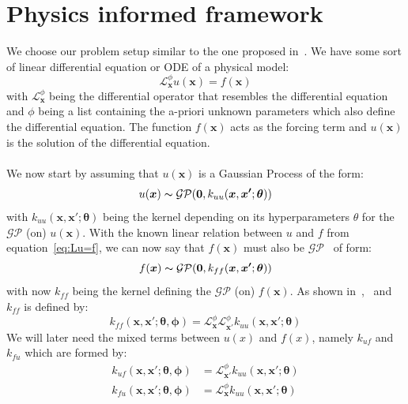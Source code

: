 \documentclass{article}
\begin{document}
\section{Physics informed framework}
We choose our problem setup similar to the one proposed in~\cite{RAISSI}. We have some sort of linear differential equation or ODE of a physical model:
\begin{equation}
    \label{eq:Lu=f}
    \mathcal{L}_{\bm{x}}^\phi u(\bm{x}) = f(\bm{x})
\end{equation}
with $\mathcal{L}_{\bm{x}}^\phi$ being the differential operator that resembles the differential equation and $\phi$ being a list containing the a-priori unknown parameters which also define the differential equation. The function $f(\bm{x})$ acts as the forcing term and $u(\bm{x})$ is the solution of the differential equation.  \\
\\
We now start by assuming that $u(\bm{x})$ is a Gaussian Process of the form:
\begin{equation}
    u(\bm{x}) \thicksim \mathcal{G}\mathcal{P}(\bm{0},k_{uu}(\bm{x},\bm{x'};\bm{\theta}))
\end{equation}
with $k_{uu}(\bm{x},\bm{x'};\bm{\theta})$ being the kernel depending on its hyperparameters $\theta$ for the $\mathcal{G}\mathcal{P}$ (on) $u(\bm{x})$. With the known linear relation between $u$ and $f$ from equation~\ref{eq:Lu=f}, we can now say that $f(\bm{x})$ must also be $\mathcal{G}\mathcal{P}$~\cite{RasmussenCarlEdward} of form:
\begin{equation}
    f(\bm{x}) \thicksim \mathcal{G}\mathcal{P}(\bm{0},k_{ff}(\bm{x},\bm{x'};\bm{\theta}))
\end{equation}
with now $k_{ff}$ being the kernel defining the $\mathcal{G}\mathcal{P}$ (on) $f(\bm{x})$. As shown in~\cite{garnett_2023_full},~\cite{Särkkä} and~\cite{RAISSI} $k_{ff}$ is defined by:
\begin{equation}
    k_{ff}(\bm{x},\bm{x'};\bm{\theta}, \bm{\phi}) = \mathcal{L}_{\bm{x}}^\phi \mathcal{L}_{\bm{x'}}^\phi k_{uu}(\bm{x},\bm{x'};\bm{\theta}) 
\end{equation}
We will later need the mixed terms between $u(x)$ and $f(x)$, namely $k_{uf}$ and $k_{fu}$ which are formed by:
\begin{equation}
    \begin{aligned}
        k_{uf}(\bm{x,x'};\bm{\theta,\phi}) &= \mathcal{L}_{\bm{x'}}^\phi k_{uu}(\bm{x},\bm{x'};\bm{\theta}) \\
        k_{fu}(\bm{x,x'};\bm{\theta,\phi}) &= \mathcal{L}_{\bm{x}}^\phi k_{uu}(\bm{x},\bm{x'};\bm{\theta})
    \end{aligned}
\end{equation}
\end{document}
